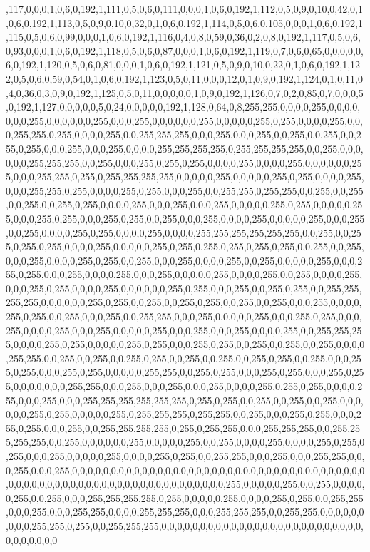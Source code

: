 \begin{DoxyCompactItemize}
,117,0,0,0,1,0,6,0,192,1,111,0,5,0,6,0,111,0,0,0,1,0,6,0,192,1,112,0,5,0,9,0,10,0,42,0,1,0,6,0,192,1,113,0,5,0,9,0,10,0,32,0,1,0,6,0,192,1,114,0,5,0,6,0,105,0,0,0,1,0,6,0,192,1,115,0,5,0,6,0,99,0,0,0,1,0,6,0,192,1,116,0,4,0,8,0,59,0,36,0,2,0,8,0,192,1,117,0,5,0,6,0,93,0,0,0,1,0,6,0,192,1,118,0,5,0,6,0,87,0,0,0,1,0,6,0,192,1,119,0,7,0,6,0,65,0,0,0,0,0,6,0,192,1,120,0,5,0,6,0,81,0,0,0,1,0,6,0,192,1,121,0,5,0,9,0,10,0,22,0,1,0,6,0,192,1,122,0,5,0,6,0,59,0,54,0,1,0,6,0,192,1,123,0,5,0,11,0,0,0,12,0,1,0,9,0,192,1,124,0,1,0,11,0,4,0,36,0,3,0,9,0,192,1,125,0,5,0,11,0,0,0,0,0,1,0,9,0,192,1,126,0,7,0,2,0,85,0,7,0,0,0,5,0,192,1,127,0,0,0,0,0,5,0,24,0,0,0,0,0,192,1,128,0,64,0,8,255,255,0,0,0,0,255,0,0,0,0,0,0,0,255,0,0,0,0,0,0,255,0,0,0,255,0,0,0,0,0,0,255,0,0,0,0,0,255,0,255,0,0,0,0,255,0,0,0,255,255,0,255,0,0,0,0,255,0,0,255,255,255,0,0,0,255,0,0,0,255,0,0,255,0,0,255,0,0,255,0,255,0,0,0,255,0,0,0,255,0,0,0,0,255,255,255,255,0,255,255,255,255,0,0,255,0,0,0,0,0,0,255,255,255,0,0,255,0,0,0,255,0,255,0,255,0,0,0,0,255,0,0,0,0,255,0,0,0,0,0,0,255,0,0,0,255,255,0,255,0,255,255,255,255,0,0,0,0,0,255,0,0,0,0,0,255,0,255,0,0,0,0,255,0,0,0,255,255,0,255,0,0,0,0,255,0,255,0,0,0,255,0,0,255,255,0,255,255,0,0,255,0,0,255,0,0,255,0,0,255,0,255,0,0,0,0,255,0,0,0,255,0,0,0,255,0,0,0,0,0,255,0,255,0,0,0,0,0,255,0,0,0,255,0,255,0,0,0,255,0,255,0,0,255,0,0,0,255,0,0,0,0,255,0,0,0,0,0,255,0,0,0,255,0,0,255,0,0,0,0,255,0,255,0,0,0,0,255,0,0,0,0,255,255,255,255,255,255,0,0,255,0,0,255,0,255,0,255,0,0,0,0,255,0,0,0,0,0,255,0,255,0,255,0,255,0,255,0,255,0,0,255,0,0,255,0,0,0,255,0,0,0,0,255,0,255,0,0,255,0,0,0,255,0,0,0,0,255,0,0,255,0,0,0,0,0,255,0,0,0,255,0,255,0,0,0,255,0,0,0,0,255,0,0,0,255,0,0,0,0,0,255,0,0,0,0,255,0,0,255,0,0,0,0,255,0,0,0,255,0,255,0,0,0,0,255,0,0,0,0,0,0,255,0,255,0,0,0,255,0,0,255,0,255,0,0,255,255,255,255,0,0,0,0,0,0,255,0,255,0,0,255,0,0,255,0,255,0,0,255,0,0,255,0,0,0,255,0,0,0,0,255,0,255,0,0,255,0,0,0,255,0,0,255,255,0,0,0,255,0,0,0,0,0,255,0,0,0,255,0,255,0,0,0,255,0,0,0,0,255,0,0,0,255,0,0,0,0,0,255,0,0,0,255,0,0,0,255,0,0,0,0,255,0,0,255,255,255,0,0,0,0,255,0,255,0,0,0,0,0,255,0,255,0,0,0,255,0,255,0,0,255,0,0,255,0,0,255,0,0,0,0,255,255,0,0,255,0,0,255,0,0,255,0,255,0,0,255,0,0,255,0,0,255,0,255,0,0,255,0,0,0,255,0,255,0,0,0,255,0,255,0,0,0,0,0,255,255,0,0,255,0,255,0,0,0,255,0,255,0,0,0,255,0,255,0,0,0,0,0,0,0,255,255,0,0,0,255,0,0,0,255,0,0,0,255,0,0,0,0,255,0,255,0,255,0,0,0,0,255,0,0,0,255,0,0,0,255,255,255,255,255,255,0,255,0,255,0,0,255,0,0,255,0,0,255,0,0,0,0,0,0,255,0,255,0,0,0,0,0,255,0,255,255,255,0,255,255,0,0,255,0,0,0,255,0,255,0,0,0,255,0,255,0,0,0,255,0,0,255,255,255,255,0,255,0,255,255,0,0,0,255,255,255,0,0,255,255,255,255,0,0,255,0,0,0,0,0,0,255,0,0,0,0,0,255,0,0,255,0,0,0,0,255,0,0,0,0,255,0,255,0,255,0,0,0,255,0,0,0,0,0,255,0,0,0,0,255,0,255,0,0,255,255,0,0,0,255,0,0,0,255,255,0,0,0,255,0,0,0,255,0,0,0,0,0,0,0,0,0,0,0,0,0,0,0,0,0,0,0,0,0,0,0,0,0,0,0,0,0,0,0,0,0,0,0,0,0,0,0,0,0,0,0,0,0,0,0,0,0,0,0,0,0,0,0,0,0,0,0,0,0,0,0,0,0,0,255,0,0,0,0,0,255,0,0,255,0,0,0,0,0,255,0,0,255,0,0,0,255,255,255,255,0,255,0,0,0,0,0,255,0,0,0,0,255,0,255,0,0,255,255,0,0,0,255,0,0,0,255,255,0,0,0,0,255,255,255,0,0,0,255,255,255,0,0,255,255,0,0,0,0,0,0,0,0,0,255,255,0,255,0,0,255,255,255,0,0,0,0,0,0,0,0,0,0,0,0,0,0,0,0,0,0,0,0,0,0,0,0,0,0,0,0,0,0,0,0,0
\end{DoxyCompactItemize}
